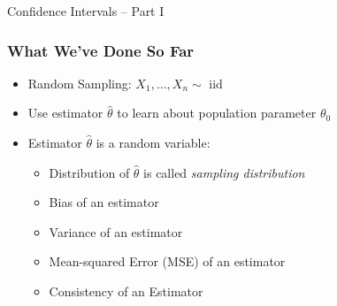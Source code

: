 \documentclass[handout]{beamer}
\date{Lecture 16}
\begin{document}
 





\begin{frame}[plain]
	\titlepage 
	

\end{frame} 




\begin{frame}

\centering \Huge Confidence Intervals -- Part I

\end{frame}

\begin{frame}
\frametitle{What We've Done So Far}

\begin{itemize}
\item Random Sampling: $X_1, \hdots, X_n \sim \mbox{ iid}$ 
\item Use estimator $\widehat{\theta}$ to learn about population parameter $\theta_0$ 
\item Estimator $\widehat{\theta}$ is a random variable: 
	\begin{itemize}
		\item Distribution of $\widehat{\theta}$ is called \emph{sampling distribution}
		\item Bias of an estimator 
		\item Variance of an estimator 
		\item Mean-squared Error (MSE) of an estimator 
		\item Consistency of an Estimator
	\end{itemize}
\end{itemize}


\end{frame}
\end{document}
